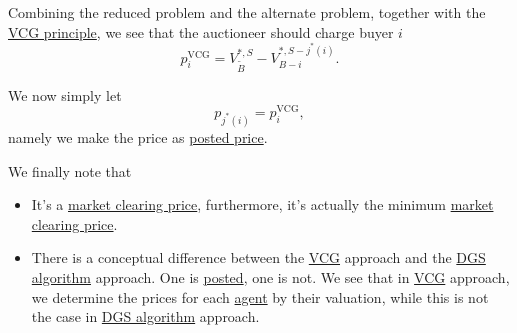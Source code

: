 Combining the reduced problem and the alternate problem, together with the \hyperref[thm:VCG]{VCG principle}, we see that the auctioneer should charge buyer \(i\)
\[
	p_{i}^\mathrm{VCG} = V_{\widetilde{B} }^{*, S} - V_{B-i}^{\ast, S-j^{\ast} (i)}.
\]

We now simply let
\[
	p_{j^{\ast} (i)} = p_{i}^\mathrm{VCG},
\]
namely we make the price as \hyperref[rmk:posted]{posted price}.

\begin{remark}
	We finally note that
	\begin{itemize}
		\item It's a \hyperref[note:market-clearing-prices]{market clearing price}, furthermore, it's actually the minimum
		      \hyperref[note:market-clearing-prices]{market clearing price}.
		\item There is a conceptual difference between the \hyperref[thm:VCG]{VCG} approach and the \hyperref[algo:Demange-Gale-Sotomayor-algorithm]{DGS algorithm}
		      approach. One is \hyperref[rmk:posted]{posted}, one is not. We see that in \hyperref[thm:VCG]{VCG} approach, we determine
		      the prices for each \hyperref[def:player]{agent} by their valuation, while this is not the case in
		      \hyperref[algo:Demange-Gale-Sotomayor-algorithm]{DGS algorithm} approach.
	\end{itemize}
\end{remark}